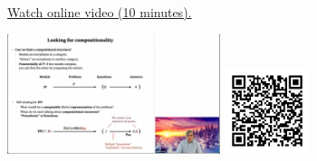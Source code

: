 
\begin{minipage}{10cm}
    \href{https://act4e-spring21.netlify.app/videos/spring2021-functorial-comp-a:from-math-to-impl.html}{Watch online video (10 minutes).}
        
    \href{https://act4e-spring21.netlify.app/videos/spring2021-functorial-comp-a:from-math-to-impl.html}{\includegraphics[height=3.5cm]{spring2021-functorial-comp-a:from-math-to-impl/thumbnails.jpg}}
    \href{https://act4e-spring21.netlify.app/videos/spring2021-functorial-comp-a:from-math-to-impl.html}{\includegraphics[height=2.5cm]{spring2021-functorial-comp-a:from-math-to-impl/qrcode.png}}
\end{minipage}
